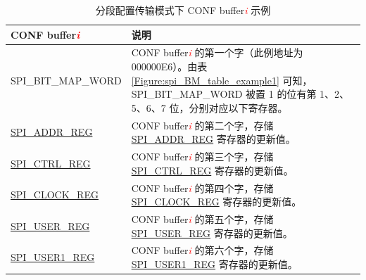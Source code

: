 \documentclass[main\_\_CN.tex]{subfiles}
\begin{document}
\begin{table}[H]
\centering
\caption{分段配置传输模式下 CONF buffer\textcolor{red}{\it i} 示例}
\label{Figure:spi_BM_table_example2}
\begin{tabular}{|L{4cm}|p{8cm}|}
\hline
{}
CONF buffer\textcolor{red}{\it i} & 说明 \\
\hline
SPI\_BIT\_MAP\_WORD & CONF buffer\textcolor{red}{\it i} 的第一个字（此例地址为 \hexprefix{}000000E6）。由表 \ref{Figure:spi_BM_table_example1} 可知，SPI\_BIT\_MAP\_WORD 被置 1 的位有第 1、2、5、6、7 位，分别对应以下寄存器。 \\
\hline
\hyperref[regdesc:SPIADDRREG]{SPI\_ADDR\_REG} & CONF buffer\textcolor{red}{\it i} 的第二个字，存储 \hyperref[regdesc:SPIADDRREG]{SPI\_ADDR\_REG} 寄存器的更新值。 \\
\hline
\hyperref[regdesc:SPICTRLREG]{SPI\_CTRL\_REG} & CONF buffer\textcolor{red}{\it i} 的第三个字，存储 \hyperref[regdesc:SPICTRLREG]{SPI\_CTRL\_REG} 寄存器的更新值。 \\
\hline
\hyperref[regdesc:SPICLOCKREG]{SPI\_CLOCK\_REG} & CONF buffer\textcolor{red}{\it i} 的第四个字，存储 \hyperref[regdesc:SPICLOCKREG]{SPI\_CLOCK\_REG} 寄存器的更新值。 \\
\hline
\hyperref[regdesc:SPIUSERREG]{SPI\_USER\_REG} & CONF buffer\textcolor{red}{\it i} 的第五个字，存储 \hyperref[regdesc:SPIUSERREG]{SPI\_USER\_REG} 寄存器的更新值。 \\
\hline
\hyperref[regdesc:SPIUSER1REG]{SPI\_USER1\_REG} & CONF buffer\textcolor{red}{\it i} 的第六个字，存储 \hyperref[regdesc:SPIUSER1REG]{SPI\_USER1\_REG} 寄存器的更新值。 \\
\hline
\end{tabular}
\end{table}
\end{document}
